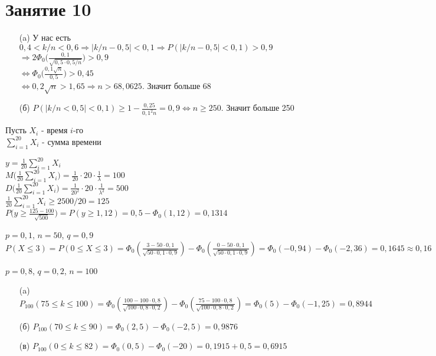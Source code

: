 \section*{Занятие 10}
\begin{exercise}[3]
	\begin{enumerate}
		\item [(a)] У нас есть $0,4 < k/n < 0,6 \Rightarrow |k/n-0,5|<0,1 \Rightarrow P(|k/n-0,5|<0,1) > 0,9$ \\ $\Rightarrow 2\Phi_0\Big(\frac{0,1}{\sqrt{0,5 \cdot 0,5/n}}\Big) > 0,9$ \\ $\Leftrightarrow \Phi_0\Big(\frac{0,1\sqrt{n}}{0,5}\Big) > 0,45$ \\ $\Leftrightarrow 0,2\sqrt{n} > 1,65 \Rightarrow n > 68,0625$. Значит больше 68
		\item [(б)] $P(|k/n<0,5|<0,1) \geq 1 - \frac{0,25}{0,1^2 n} = 0,9 \Leftrightarrow n \geq 250$. Значит больше 250
	\end{enumerate}
\end{exercise}

\begin{exercise}[4]
	Пусть $X_i$ - время $i$-го \\ $\sum_{i=1}^{20}X_i$ - сумма времени
	
	$y = \frac{1}{20} \sum_{i=1}^{20}X_i$ \\ $M\Big(\frac{1}{20}\sum_{i=1}^{20}X_i\Big)=\frac{1}{20}\cdot 20 \cdot \frac{1}{\lambda} = 100$ \\ $D\Big(\frac{1}{20}\sum_{i=1}^{20}X_i\Big) = \frac{1}{20^2} \cdot 20 \cdot \frac{1}{\lambda^2} = 500$ \\ $\frac{1}{20}\sum_{i=1}^{20}X_i \geq 2500/20 = 125$ \\ $P\Big(y \geq \frac{125-100}{\sqrt{500}}\Big) = P(y \geq 1,12) = 0,5 - \Phi_0(1,12) = 0,1314$
\end{exercise}

\begin{exercise}[5]
	$p=0,1$, $n=50$, $q=0,9$ \\ $P(X \leq 3) = P(0 \leq X \leq 3) = \Phi_0(\frac{3-50 \cdot 0,1}{\sqrt{50 \cdot 0,1 \cdot 0,9}}) - \Phi_0(\frac{0-50 \cdot 0,1}{\sqrt{50 \cdot 0,1 \cdot 0,9}}) = \Phi_0(-0,94) - \Phi_0(-2,36) = 0,1645 \approx 0,16$
\end{exercise}

\begin{exercise}[6]
	$p=0,8$, $q=0,2$, $n=100$
	\begin{enumerate}
		\item [(a)] $P_{100}(75 \leq k \leq 100) = \Phi_0(\frac{100-100\cdot 0,8}{\sqrt{100\cdot 0,8\cdot 0,2}})-\Phi_0(\frac{75-100\cdot 0,8}{\sqrt{100\cdot 0,8\cdot 0,2}}) = \Phi_0(5)-\Phi_0(-1,25) = 0,8944$
		\item [(б)] $P_{100}(70 \leq k \leq 90) = \Phi_0(2,5) - \Phi_0(-2,5) = 0,9876$
		\item [(в)] $P_{100}(0 \leq k \leq 82) = \Phi_0(0,5) - \Phi_0(-20) = 0,1915+0,5=0,6915$
	\end{enumerate}
\end{exercise}

